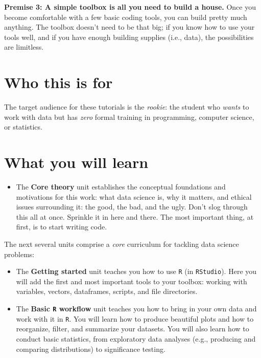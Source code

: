 \documentclass[
]{book}
\providecommand{\tightlist}{%
  \setlength{\itemsep}{0pt}\setlength{\parskip}{0pt}}
\begin{document}
\textbf{Premise 3: A simple toolbox is all you need to build a house.} Once you become comfortable with a few basic coding tools, you can build pretty much anything. The toolbox doesn't need to be that big; if you know how to use your tools well, and if you have enough building supplies (i.e., data), the possibilities are limitless.

\hypertarget{who-this-is-for}{%
\section*{Who this is for}\label{who-this-is-for}}

The target audience for these tutorials is the \emph{rookie}: the student who \emph{wants} to work with data but has \emph{zero} formal training in programming, computer science, or statistics.

\hypertarget{what-you-will-learn}{%
\section*{What you will learn}\label{what-you-will-learn}}

\begin{itemize}
\tightlist
\item
  The \textbf{Core theory} unit establishes the conceptual foundations and motivations for this work: what data science is, why it matters, and ethical issues surrounding it: the good, the bad, and the ugly. Don't slog through this all at once. Sprinkle it in here and there. The most important thing, at first, is to start writing code.
\end{itemize}

The next several units comprise a \emph{core} curriculum for tackling data science problems:

\begin{itemize}
\item
  The \textbf{Getting started} unit teaches you how to use \texttt{R} (in \texttt{RStudio}). Here you will add the first and most important tools to your toolbox: working with variables, vectors, dataframes, scripts, and file directories.
\item
  The \textbf{Basic \texttt{R} workflow} unit teaches you how to bring in your own data and work with it in \texttt{R}. You will learn how to produce beautiful plots and how to reorganize, filter, and summarize your datasets. You will also learn how to conduct basic statistics, from exploratory data analyses (e.g., producing and comparing distributions) to significance testing.
\end{itemize}
\end{document}
